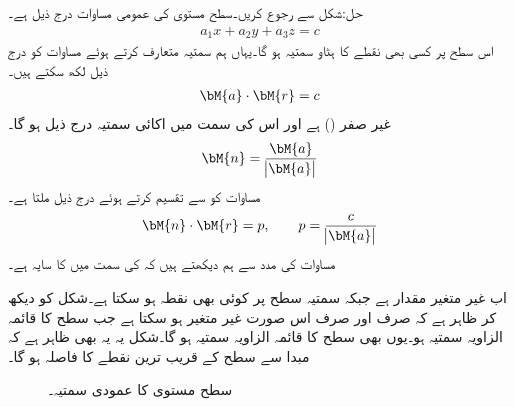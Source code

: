 حل:شکل  سے رجوع کریں۔سطح مستوی کی عمومی مساوات درج ذیل ہے۔
\begin{align}\label{مساوات_الجبرا_سیدھی_سطح_الف}
a_1x+a_2y+a_3z=c
\end{align} 
اس سطح پر کسی بھی نقطے کا ہٹاو سمتیہ  ہو گا۔یہاں ہم سمتیہ  متعارف کرتے ہوئے  مساوات  کو درج ذیل لکھ سکتے ہیں۔
\begin{align}\label{مساوات_الجبرا_سیدھی_سطح_ب}
\bM{a}\cdot\bM{r}=c
\end{align}
 غیر صفر () ہے اور اس کی سمت میں اکائی سمتیہ  درج ذیل ہو گا۔
\begin{align*}
\bM{n}=\frac{\bM{a}}{\abs{\bM{a}}}
\end{align*}
مساوات  کو  سے تقسیم کرتے ہوئے درج ذیل ملتا ہے۔
\begin{align}
\bM{n}\cdot \bM{r}=p,\quad \quad  p=\frac{c}{\abs{\bM{a}}}
\end{align}
مساوات  کی مدد سے ہم دیکھتے ہیں کہ  کی سمت میں  کا سایہ  ہے۔

اب  غیر متغیر مقدار ہے جبکہ سمتیہ  سطح پر کوئی بھی نقطہ ہو سکتا ہے۔شکل کو دیکھ کر ظاہر ہے کہ  صرف اور صرف اس صورت غیر متغیر ہو سکتا ہے جب  سطح کا قائمہ الزاویہ سمتیہ ہو۔یوں  بھی سطح کا قائمہ الزاویہ سمتیہ ہو گا۔شکل یہ یہ بھی ظاہر ہے کہ مبدا سے سطح کے قریب ترین نقطے کا فاصلہ  ہو گا۔
\begin{figure}
\centering
{}
\caption{سطح مستوی کا عمودی سمتیہ۔}
\label{شکل_سمتیہ_سطحی_قائمہ_الزاویہ}
\end{figure}

